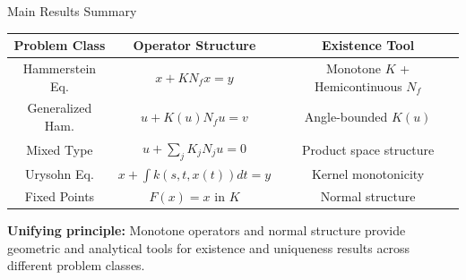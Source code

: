 \documentclass[aspectratio=169,10pt]{beamer}
\begin{document}
\begin{frame}{Main Results Summary}
    \begin{center}
        \begin{tabular}{|c|c|c|}
            \hline
            \textbf{Problem Class} & \textbf{Operator Structure} & \textbf{Existence Tool} \\
            \hline
            Hammerstein Eq. & $x + KN_f x = y$ & Monotone $K$ + Hemicontinuous $N_f$ \\
            \hline
            Generalized Ham. & $u + K(u)N_f u = v$ & Angle-bounded $K(u)$ \\
            \hline
            Mixed Type & $u + \sum_j K_j N_j u = 0$ & Product space structure \\
            \hline
            Urysohn Eq. & $x + \int k(s,t,x(t))dt = y$ & Kernel monotonicity \\
            \hline
            Fixed Points & $F(x) = x$ in $K$ & Normal structure \\
            \hline
        \end{tabular}
    \end{center}

    \vspace{0.5cm}

    \textbf{Unifying principle:} Monotone operators and normal structure provide
    geometric and analytical tools for existence and uniqueness results across different problem classes.
\end{frame}
\end{document}
